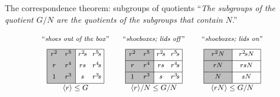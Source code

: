 \documentclass[8pt, handout]{beamer}
\begin{document}
\begin{frame}{The correspondence theorem: subgroups of quotients}
  ``\emph{The subgroups of the
    quotient $G/N$ are the quotients of the subgroups that contain $N$}.''
  

  \[
  \begin{tikzpicture}[scale=.61]
    \tikzstyle{every node}=[font=\footnotesize,anchor=south]
    \begin{scope}[shift={(11,0)}]
    \node at (2,2.7) {``\emph{shoeboxes; lids on}''};
      \draw[thin,fill=faded] (0,0) rectangle (2,2.4);
      \draw[thin] (2,2.4) to (4,2.4); 
      \draw[thin] (0,1.6) to (4,1.6);
      \draw[thin] (0,.8) to (4,.8);
      \draw[thin] (2,0) to (4,0);
      \draw[thin] (4,0) to (4,2.4);
      \node at (1,.13) {$N$};
      \node at (3,.13) {$sN$};
      \node at (1,.93) {$rN$};
      \node at (3,.93) {$rsN$};
      \node at (1,1.73) {$r^2N$};
      \node at (3,1.73) {$r^2\!sN$};
      \node at (2,-.8) {\small $\<rN\>\leq G/N$};
    \end{scope}
    \begin{scope}[shift={(5.5,0)}]
      \draw[thin,fill=faded] (0,0) rectangle (2,2.4);
      \node at (2,2.7) {``\emph{shoeboxes; lids off}''};
      \draw[thin] (2,2.4) to (4,2.4); 
      \draw[thin] (0,1.6) to (4,1.6);
      \draw[thin] (0,.8) to (4,.8);
      \draw[thin] (2,0) to (4,0);
      \draw[thin] (4,0) to (4,2.4);
      \node at (.5,.13) {$1$};
      \node at (1.5,.13) {$r^3$};
      \node at (2.5,.13) {$s$};
      \node at (3.5,.13) {$r^3\!s$};
      \node at (.5,.93) {$r$};
      \node at (1.5,.93) {$r^4$};
      \node at (2.5,.93) {$rs$};
      \node at (3.5,.93) {$r^4\!s$};
      \node at (.5,1.73) {$r^2$};
      \node at (1.5,1.73) {$r^5$};
      \node at (2.5,1.73) {$r^2\!s$};
      \node at (3.5,1.73) {$r^5\!s$};
      \node at (2,-.8) {\small $\<r\>/N\leq G/N$};
    \end{scope}
    \begin{scope}[shift={(0,0)}]
      \draw[thin,fill=faded] (0,0) rectangle (2,2.4);
      \node at (2,2.7) {``\emph{shoes out of the box}''};
      \draw[thin] (2,2.4) to (4,2.4); 
      \draw[thin] (2,0) to (4,0);
      \draw[thin] (4,0) to (4,2.4);
      \node at (.5,.13) {$1$};
      \node at (1.5,.13) {$r^3$};
      \node at (2.5,.13) {$s$};
      \node at (3.5,.13) {$r^3\!s$};
      \node at (.5,.93) {$r$};
      \node at (1.5,.93) {$r^4$};
      \node at (2.5,.93) {$rs$};
      \node at (3.5,.93) {$r^4\!s$};
      \node at (.5,1.73) {$r^2$};
      \node at (1.5,1.73) {$r^5$};
      \node at (2.5,1.73) {$r^2\!s$};
      \node at (3.5,1.73) {$r^5\!s$};
      \node at (2,-.8) {\small $\<r\>\leq G$};
    \end{scope}
  \end{tikzpicture}
  \]
  
\end{frame}
\end{document}
